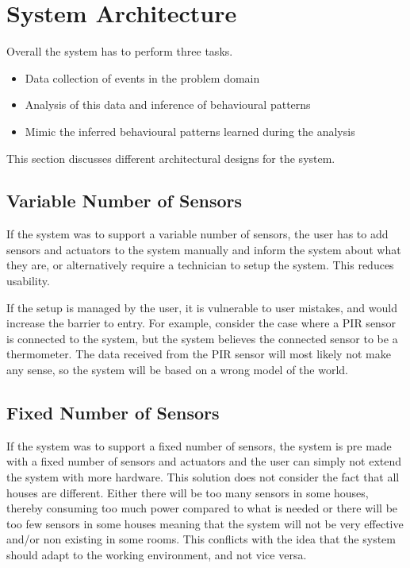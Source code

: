 \section{System Architecture}\label{sec:architecture}

Overall the system has to perform three tasks.

\begin{itemize}
\item Data collection of events in the problem domain
\item Analysis of this data and inference of behavioural patterns
\item Mimic the inferred behavioural patterns learned during the analysis
\end{itemize}
This section discusses different architectural designs for the system.

\subsection{Variable Number of Sensors}
If the system was to support a variable number of sensors, the user has to add sensors and actuators to the system manually and inform the system about what they are, or alternatively require a technician to setup the system. This reduces usability.

If the setup is managed by the user, it is vulnerable to user mistakes, and would increase the barrier to entry. For example, consider the case where a PIR sensor is connected to the system, but the system believes the connected sensor to be a thermometer. The data received from the PIR sensor will most likely not make any sense, so the system will be based on a wrong model of the world.

\subsection{Fixed Number of Sensors}
If the system was to support a fixed number of sensors, the system is pre made with a fixed number of sensors and actuators and the user can simply not extend the system with more hardware. This solution does not consider the fact that all houses are different. Either there will be too many sensors in some houses, thereby consuming too much power compared to what is needed or there will be too few sensors in some houses meaning that the system will not be very effective and/or non existing in some rooms. This conflicts with the idea that the system should adapt to the working environment, and not vice versa.

